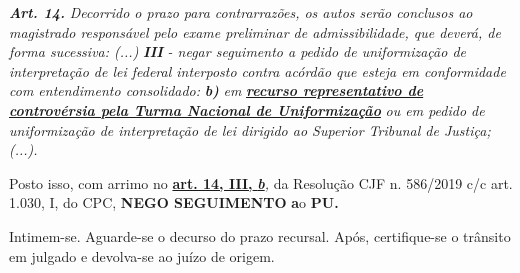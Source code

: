 \documentclass[12pt]{article}
\begin{document}
\noindent \textit{\textbf{Art. 14.}}\textit{ Decorrido o prazo para contrarrazões, os autos serão conclusos ao magistrado responsável pelo exame preliminar de admissibilidade, que deverá, de forma sucessiva: (...) }\textit{\textbf{III }}\textit{- negar seguimento a pedido de uniformização de interpretação de lei federal interposto contra acórdão que esteja em conformidade com entendimento consolidado: }\textit{\textbf{b)}}\textit{ em }\uline{\textit{\textbf{recurso representativo de controvérsia pela Turma Nacional de Uniformização}}}\textit{ ou em pedido de uniformização de interpretação de lei dirigido ao Superior Tribunal de Justiça;(...).}

\noindent Posto isso, com arrimo no \uline{\textbf{art. 14, III, }}\uline{\textit{\textbf{b}}}\textit{,} da Resolução CJF n. 586/2019 c/c art. 1.030, I, do CPC, \textbf{NEGO SEGUIMENTO }\textbf{a}o\textbf{ PU}\textbf{.}

\noindent Intimem-se. Aguarde-se o decurso do prazo recursal. Após, certifique-se o trânsito em julgado e devolva-se ao juízo de origem.
\end{document}
